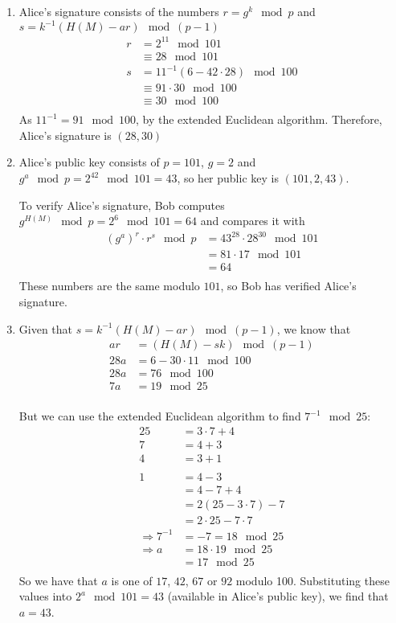\begin{enumerate}
\item Alice's signature consists of the numbers $r = g^k\mod p$ and
  $s = k^{-1}(H(M) - ar)\mod (p-1)$
  \begin{align*}
    r &= 2^{11} \mod 101 \\
      &\equiv 28 \mod 101 \\
    s &= 11^{-1}(6 - 42 \cdot 28)\mod 100 \\
      &\equiv 91 \cdot 30\mod 100 \\
      &\equiv 30 \mod 100\\
  \end{align*}
  As $11^{-1} = 91\mod 100$, by the extended Euclidean algorithm. Therefore, Alice's signature is $(28, 30)$

\item Alice's public key consists of $p = 101$, $g = 2$ and $g^a \mod p = 2^{42}
  \mod 101 = 43$, so her public key is $(101, 2, 43)$.

  To verify Alice's signature, Bob computes $g^{H(M)} \mod p = 2^6 \mod 101 = 64$
  and compares it with
  \begin{align*}
    (g^a)^r \cdot r^s \mod p &= 43^{28} \cdot 28^{30} \mod 101 \\
                             &= 81 \cdot 17 \mod 101 \\
                             &= 64 \\
  \end{align*}
  These numbers are the same modulo $101$, so Bob has verified Alice's signature.

\item Given that $s = k^{-1}(H(M) - ar)\mod (p-1)$, we know that
  \begin{align*}
    ar &= (H(M) - sk) \mod (p-1) \\
    28a &= 6 - 30 \cdot 11 \mod 100 \\
    28a &= 76 \mod 100 \\
    7a &= 19 \mod 25 \\
  \end{align*}

  But we can use the extended Euclidean algorithm to find $7^{-1} \mod 25$:
  \begin{align*}
    25 &= 3\cdot7 + 4 \\
    7 &= 4 + 3 \\
    4 &= 3 + 1 \\
    \\
    1 &= 4 - 3 \\
      &= 4 - 7 + 4 \\
      &= 2(25 - 3\cdot7) -7 \\
      &= 2\cdot25 - 7\cdot7 \\
  \Rightarrow 7^{-1} &= -7 = 18 \mod 25 \\
      \Rightarrow a &= 18 \cdot 19 \mod 25 \\
                    &= 17 \mod 25 \\
  \end{align*}
  So we have that $a$ is one of $17$, $42$, $67$ or $92$ modulo 100. Substituting
  these values into $2^{a} \mod 101 = 43$ (available in Alice's public key), we
  find that $a = 43$.

\end{enumerate}
